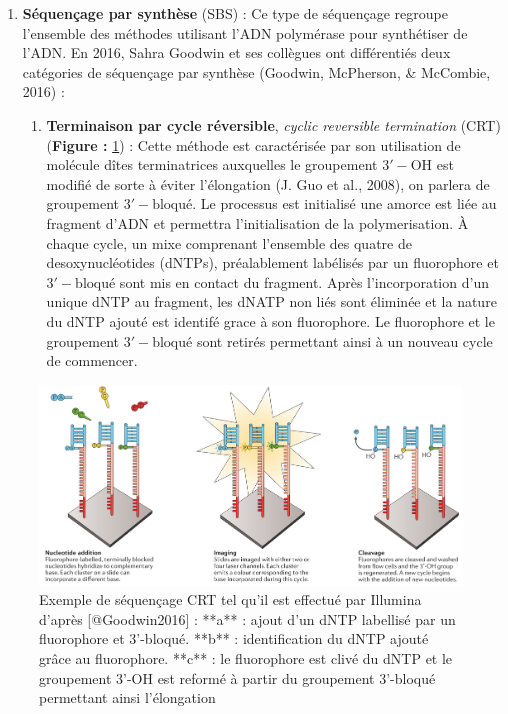 \documentclass[12pt,twoside]{reedthesis}
\providecommand{\tightlist}{%
  \setlength{\itemsep}{0pt}\setlength{\parskip}{0pt}}
\theoremstyle{definition}
\theoremstyle{definition}
\theoremstyle{remark}
\begin{document}
  \begin{enumerate}
  \def\labelenumi{\arabic{enumi}.}
  \tightlist
  \item
    \textbf{Séquençage par synthèse} (SBS) : Ce type de séquençage
    regroupe l'ensemble des méthodes utilisant l'ADN polymérase pour
    synthétiser de l'ADN. En 2016, Sahra Goodwin et ses collègues ont
    différentiés deux catégories de séquençage par synthèse (Goodwin,
    McPherson, \& McCombie, 2016) :
  
    \begin{enumerate}
    \def\labelenumii{\alph{enumii}.}
    \tightlist
    \item
      \textbf{Terminaison par cycle réversible}, \emph{cyclic reversible
      termination} (CRT) (\textbf{Figure : }\ref{fig:crtSeq}) : Cette
      méthode est caractérisée par son utilisation de molécule dîtes
      terminatrices auxquelles le groupement \(\mathrm{3'-OH}\) est
      modifié de sorte à éviter l'élongation (J. Guo et al., 2008), on
      parlera de groupement \(\mathrm{3'-bloqué}\). Le processus est
      initialisé une amorce est liée au fragment d'ADN et permettra
      l'initialisation de la polymerisation. À chaque cycle, un mixe
      comprenant l'ensemble des quatre de desoxynucléotides (dNTPs),
      préalablement labélisés par un fluorophore et \(\mathrm{3'-bloqué}\)
      sont mis en contact du fragment. Après l'incorporation d'un unique
      dNTP au fragment, les dNATP non liés sont éliminée et la nature du
      dNTP ajouté est identifé grace à son fluorophore. Le fluorophore et
      le groupement \(\mathrm{3'-bloqué}\) sont retirés permettant ainsi à
      un nouveau cycle de commencer.
    \end{enumerate}
  \end{enumerate}
  
  \begin{figure}
  
  {\centering \includegraphics[scale=.28]{figure/CRT_seq_illumina} 
  
  }
  
  \caption[Exemple de séquençage CRT tel qu'il est effectué par Illumina]{Exemple de séquençage CRT tel qu'il est effectué par Illumina d'après [@Goodwin2016] : **a** : ajout d'un dNTP labellisé par un fluorophore et 3'-bloqué. **b** : identification du dNTP ajouté grâce au fluorophore. **c** : le fluorophore est clivé du dNTP et le groupement 3'-OH est reformé à partir du groupement 3'-bloqué permettant ainsi l'élongation}\label{fig:crtSeq}
  \end{figure}
  
\end{document}
